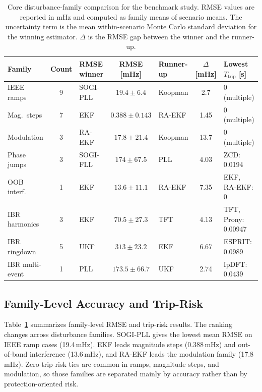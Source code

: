 \documentclass[conference,letterpaper]{IEEEtran}
\begin{document}
\begin{table}[t]
  \centering
  \caption{Core disturbance-family comparison for the benchmark study.
    RMSE values are reported in mHz and computed as family means of
    scenario means. The uncertainty term is the mean within-scenario Monte
    Carlo standard deviation for the winning estimator. $\Delta$ is the RMSE gap
    between the winner and the runner-up.}
  \label{tab:family_summary}
  \scriptsize
  \setlength{\tabcolsep}{2.8pt}
  \renewcommand{\arraystretch}{1.1}
  \begin{tabular}{l c l c l c l}
    \toprule
    Family & Count & RMSE winner & RMSE [mHz] & Runner-up & $\Delta$ [mHz] & Lowest $T_{\mathrm{trip}}$ [s] \\
    \midrule
    IEEE ramps & 9 & SOGI-PLL & $19.4 \pm 6.4$ & Koopman & 2.7 & 0 (multiple) \\
    Mag.\ steps & 7 & EKF & $0.388 \pm 0.143$ & RA-EKF & 1.45 & 0 (multiple) \\
    Modulation & 3 & RA-EKF & $17.8 \pm 21.4$ & Koopman & 13.7 & 0 (multiple) \\
    Phase jumps & 3 & SOGI-FLL & $174 \pm 67.5$ & PLL & 4.03 & ZCD: 0.0194 \\
    OOB interf. & 1 & EKF & $13.6 \pm 11.1$ & RA-EKF & 7.35 & EKF, RA-EKF: 0 \\
    IBR harmonics & 3 & EKF & $70.5 \pm 27.3$ & TFT & 4.13 & TFT, Prony: 0.00947 \\
    IBR ringdown & 5 & UKF & $313 \pm 23.2$ & EKF & 6.67 & ESPRIT: 0.0989 \\
    IBR multi-event & 1 & PLL & $173.5 \pm 66.7$ & UKF & 2.74 & IpDFT: 0.0439 \\
    \bottomrule
  \end{tabular}
\end{table}

\subsection{Family-Level Accuracy and Trip-Risk}

Table~\ref{tab:family_summary} summarizes family-level RMSE and trip-risk
results. The ranking changes across disturbance families. SOGI-PLL gives the
lowest mean RMSE on IEEE ramp cases (19.4\,mHz). EKF leads magnitude steps
(0.388\,mHz) and out-of-band interference (13.6\,mHz), and RA-EKF leads the
modulation family (17.8\,mHz). Zero-trip-risk ties are common in ramps,
magnitude steps, and modulation, so those families are separated mainly by
accuracy rather than by protection-oriented risk.
\end{document}
